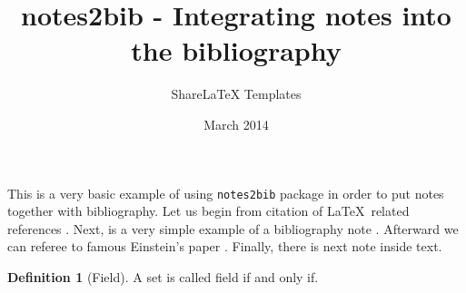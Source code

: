 \documentclass{article}
\title{notes2bib - Integrating notes into the bibliography}
\author{ShareLaTeX Templates}
\date{March 2014}
\theoremstyle{definition}
\newtheorem{definition}{Definition}[section]
\begin{document}
\maketitle

This is a very basic example of using \texttt{notes2bib} package in order to put notes together with bibliography. 
Let us begin from citation of \LaTeX\ related references \cite{latexcompanion,knuthwebsite}. Next, is a very simple example of a bibliography note . Afterward we can referee to famous Einstein's paper \cite{einstein}. Finally, there is next note  inside text. 

\begin{definition}[Field]
A set is called field if and only if.
\end{definition}



\end{document}
